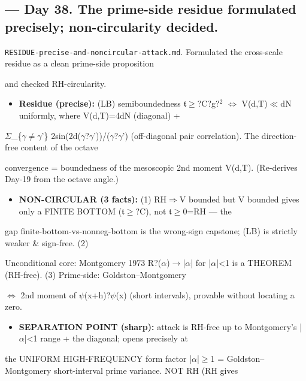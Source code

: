 \documentclass[10pt]{article}
\begin{document}
\subsection*{ --- Day 38. The prime-side residue formulated precisely; non-circularity decided.}
\texttt{RESIDUE-precise-and-noncircular-attack.md}. Formulated the cross-scale residue as a clean prime-side proposition\par
and checked RH-circularity.\par
\begin{itemize}
\item \textbf{Residue (precise):} (LB) semiboundedness \ensuremath{\mathfrak{t}}\ensuremath{\ge}?C?g?\ensuremath{^2} \ensuremath{\iff} V(d,T)\ensuremath{\ll}dN uniformly, where V(d,T)=4dN (diagonal) +
\end{itemize}
  \ensuremath{\Sigma}\_\{\ensuremath{\gamma}\ensuremath{\ne}\ensuremath{\gamma}'\} 2sin(2d(\ensuremath{\gamma}?\ensuremath{\gamma}'))/(\ensuremath{\gamma}?\ensuremath{\gamma}') (off-diagonal pair correlation). The direction-free content of the octave\par
  convergence = boundedness of the mesoscopic 2nd moment V(d,T). (Re-derives Day-19 from the octave angle.)\par
\begin{itemize}
\item \textbf{NON-CIRCULAR (3 facts):} (1) RH\ensuremath{\Rightarrow}V bounded but V bounded gives only a FINITE BOTTOM (\ensuremath{\mathfrak{t}}\ensuremath{\ge}?C), not \ensuremath{\mathfrak{t}}\ensuremath{\ge}0=RH --- the
\end{itemize}
  gap finite-bottom-vs-nonneg-bottom is the wrong-sign capstone; (LB) is strictly weaker \& sign-free. (2)\par
  Unconditional core: Montgomery 1973 R?(\ensuremath{\alpha})\ensuremath{\to}|\ensuremath{\alpha}| for |\ensuremath{\alpha}|<1 is a THEOREM (RH-free). (3) Prime-side: Goldston--Montgomery\par
  \ensuremath{\iff} 2nd moment of \ensuremath{\psi}(x+h)?\ensuremath{\psi}(x) (short intervals), provable without locating a zero.\par
\begin{itemize}
\item \textbf{SEPARATION POINT (sharp):} attack is RH-free up to Montgomery's |\ensuremath{\alpha}|<1 range + the diagonal; opens precisely at
\end{itemize}
  the UNIFORM HIGH-FREQUENCY form factor |\ensuremath{\alpha}|\ensuremath{\ge}1 = Goldston--Montgomery short-interval prime variance. NOT RH (RH gives\par
\end{document}
